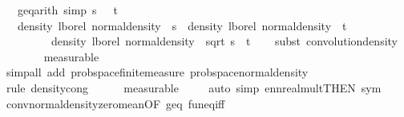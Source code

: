 \begin{isabellebody}
\ \ \ geq{\isacharbrackleft}{\kern0pt}arith{\isacharcomma}{\kern0pt}\ simp{\isacharbrackright}{\kern0pt}{\isacharcolon}{\kern0pt}\ {\isachardoublequoteopen}s\ {\isachargreater}{\kern0pt}\ {}{\isachardoublequoteclose}\ {\isachardoublequoteopen}t\ {\isachargreater}{\kern0pt}\ {}{\isachardoublequoteclose}\isanewline
\ \ \ {\isachardoublequoteopen}{\isacharparenleft}{\kern0pt}density\ lborel\ {\isacharparenleft}{\kern0pt}normal{\isacharunderscore}{\kern0pt}density\ {}\ s{\isacharparenright}{\kern0pt}{\isacharparenright}{\kern0pt}\ {\isasymstar}\ {\isacharparenleft}{\kern0pt}density\ lborel\ {\isacharparenleft}{\kern0pt}normal{\isacharunderscore}{\kern0pt}density\ {}\ t{\isacharparenright}{\kern0pt}{\isacharparenright}{\kern0pt}\ \isanewline
\ \ \ \ \ \ \ \ {\isacharequal}{\kern0pt}\ {\isacharparenleft}{\kern0pt}density\ lborel\ {\isacharparenleft}{\kern0pt}normal{\isacharunderscore}{\kern0pt}density\ {}\ {\isacharparenleft}{\kern0pt}sqrt\ {\isacharparenleft}{\kern0pt}s\ {\isacharplus}{\kern0pt}\ t\isanewline
%
\isadelimproof
\ \ %
\endisadelimproof
%
\isatagproof
{}\isamarkupfalse%
\ {\isacharparenleft}{\kern0pt}subst\ convolution{\isacharunderscore}{\kern0pt}density{\isacharparenright}{\kern0pt}\isanewline
\ \ \ \ \ \ \isamarkupfalse%
\ measurable\isanewline
\ \ \isamarkupfalse%
\ {\isacharparenleft}{\kern0pt}simp{\isacharunderscore}{\kern0pt}all\ add{\isacharcolon}{\kern0pt}\ prob{\isacharunderscore}{\kern0pt}space{\isachardot}{\kern0pt}finite{\isacharunderscore}{\kern0pt}measure\ prob{\isacharunderscore}{\kern0pt}space{\isacharunderscore}{\kern0pt}normal{\isacharunderscore}{\kern0pt}density{\isacharparenright}{\kern0pt}\isanewline
\ \ \isamarkupfalse%
\ {\isacharparenleft}{\kern0pt}rule\ density{\isacharunderscore}{\kern0pt}cong{\isacharparenright}{\kern0pt}\isanewline
\ \ \ \ \isamarkupfalse%
\ measurable\isanewline
\ \ \ \isamarkupfalse%
\ {\isacharparenleft}{\kern0pt}auto\ simp{\isacharcolon}{\kern0pt}\ ennreal{\isacharunderscore}{\kern0pt}mult{\isacharbrackleft}{\kern0pt}THEN\ sym{\isacharbrackright}{\kern0pt}{\isacharparenright}{\kern0pt}\isanewline
\ \ \isamarkupfalse%
\ conv{\isacharunderscore}{\kern0pt}normal{\isacharunderscore}{\kern0pt}density{\isacharunderscore}{\kern0pt}zero{\isacharunderscore}{\kern0pt}mean{\isacharbrackleft}{\kern0pt}OF\ geq{\isacharbrackright}{\kern0pt}\ fun{\isacharunderscore}{\kern0pt}eq{\isacharunderscore}{\kern0pt}iff\ \isamarkupfalse%

\end{isabellebody}
